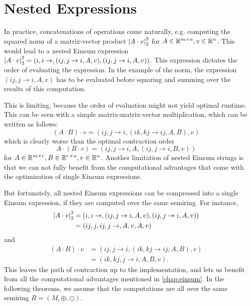 \chapter{Nested Expressions}
\label{chap:nested}

In practice, concatenations of operations come naturally, e.g. computing the squared norm of a matrix-vector product $\left\lvert A \cdot v \right\rvert_2^2$
for $A \in \mathbb{R}^{m \times n}, v \in \mathbb{R}^n$.
This would lead to a nested Einsum expression $\left\lvert A \cdot v \right\rvert_2^2 = (i,i \rightarrow , (ij, j \rightarrow i, A, v), (ij, j \rightarrow i, A, v))$.
This expression dictates the order of evaluating the expression.
In the example of the norm, the expression $(ij, j \rightarrow i, A, v)$ has to be evaluated before squaring and summing over the results of this computation.

This is limiting, because the order of evaluation might not yield optimal runtime.
This can be seen with a simple matrix-matrix-vector multiplication, which can be written as follows:
$$(A \cdot B) \cdot v = (ij, j \rightarrow i, (ik, kj \rightarrow ij, A, B), v)$$
which is clearly worse than the optimal contraction order
$$A \cdot (B \cdot v) = (ij, j \rightarrow i, A, (ij, j \rightarrow i, B, v))$$
for $A \in \mathbb{R}^{m \times r}, B \in \mathbb{R}^{r \times n}, v \in \mathbb{R}^n$.
Another limitation of nested Einsum strings is that we can not fully benefit from the computational advantages that come with the optimization of single Einsum expressions.

But fortunately, all nested Einsum expressions can be compressed into a single Einsum expression, if they are computed over the same semiring.
For instance,
\begin{align*}
    \left\lvert A \cdot v \right\rvert_2^2 & = (i,i \rightarrow , (ij, j \rightarrow i, A, v), (ij, j \rightarrow i, A, v)) \\
                        & = (ij, j, ij, j \rightarrow, A, v, A, v)
\end{align*}
and
\begin{align*}
    (A \cdot B) \cdot v & = (ij, j \rightarrow i, (ik, kj \rightarrow ij, A, B), v) \\
                        & = (ik, kj, j \rightarrow i, A, B, v).
\end{align*}
This leaves the path of contraction up to the implementation, and lets us benefit from all the computational advantages mentioned in \cref{chap:einsum}.
In the following theorems, we assume that the computations are all over the same semiring $R = (M, \oplus, \odot)$.

